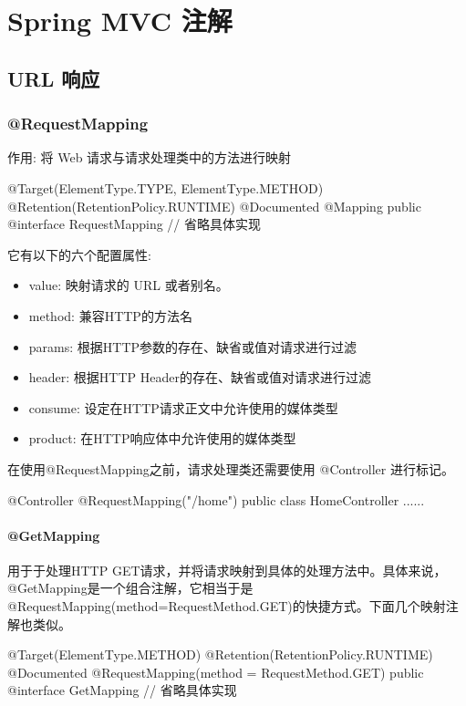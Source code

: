 \section{Spring MVC 注解}

\subsection{URL 响应}

\subsubsection{@RequestMapping}

作用: 将 Web 请求与请求处理类中的方法进行映射

\begin{Java}
@Target({ElementType.TYPE, ElementType.METHOD})
@Retention(RetentionPolicy.RUNTIME)
@Documented
@Mapping
public @interface RequestMapping {
    // 省略具体实现
}
\end{Java}

它有以下的六个配置属性:
\begin{itemize}
    \item value: 映射请求的 URL 或者别名。
    \item method: 兼容HTTP的方法名
    \item params: 根据HTTP参数的存在、缺省或值对请求进行过滤
    \item header: 根据HTTP Header的存在、缺省或值对请求进行过滤
    \item consume: 设定在HTTP请求正文中允许使用的媒体类型
    \item product: 在HTTP响应体中允许使用的媒体类型
\end{itemize}

在使用@RequestMapping之前，请求处理类还需要使用 @Controller 进行标记。

\begin{Java}
@Controller
@RequestMapping("/home")
public class HomeController {
    ......
}
\end{Java}

\paragraph*{@GetMapping}

用于于处理HTTP GET请求，并将请求映射到具体的处理方法中。具体来说，@GetMapping是一个组合注解，它相当于是@RequestMapping(method=RequestMethod.GET)的快捷方式。下面几个映射注解也类似。

\begin{Java}
@Target(ElementType.METHOD)
@Retention(RetentionPolicy.RUNTIME)
@Documented
@RequestMapping(method = RequestMethod.GET)
public @interface GetMapping {
    // 省略具体实现
}
\end{Java}

